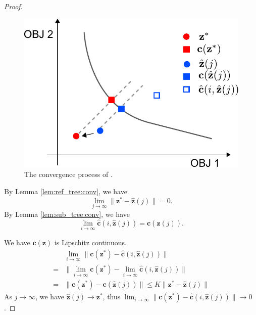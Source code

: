 \documentclass{article}
\begin{document}
\begin{proof}

\begin{figure}
\centering
\includegraphics[width=0.4\linewidth]{fig/conv}
\caption{The convergence process of .}
\label{fig:conv}
\end{figure}

By Lemma \ref{lem:ref_tree:conv}, we have 
\begin{equation}
\lim_{j \to \infty} \lVert \bm{z}^{*} - \hat{\bm{z}} (j) \rVert = 0.
\end{equation}
By Lemma \ref{lem:sub_tree:conv}, we have
\begin{equation}
\lim_{i \to \infty} \hat{\bm{c}}( i, \hat{\bm{z}}(j) ) = \bm{c}( \hat{\bm{z}}(j) ).
\end{equation}


We have $ \bm{c}( \bm{z} ) $ 
is Lipschitz continuous.
\begin{equation}
\begin{aligned}
& \lim_{i \to \infty} \lVert \bm{c}( \bm{z}^{*} ) -  \hat{\bm{c}}( i, \hat{\bm{z}}(j) ) \rVert \\
= & \lVert \lim_{i \to \infty} \bm{c}( \bm{z}^{*} ) - \lim_{i \to \infty} \hat{\bm{c}}( i, \hat{\bm{z}}(j) ) \rVert \\
= & \lVert \bm{c}( \bm{z}^{*} ) - \bm{c}( \hat{\bm{z}}(j) ) \rVert \leq K \lVert \bm{z}^{*} - \hat{\bm{z}}(j) \rVert
\end{aligned}
\end{equation}
As $ j \to \infty $, we have $ \hat{\bm{z}}(j) \to \bm{z}^{*} $, thus $ \lim_{i \to \infty} \lVert \bm{c}( \bm{z}^{*} ) -  \hat{\bm{c}}( i, \hat{\bm{z}}(j) ) \rVert \to 0 $.
\end{proof}
\end{document}
